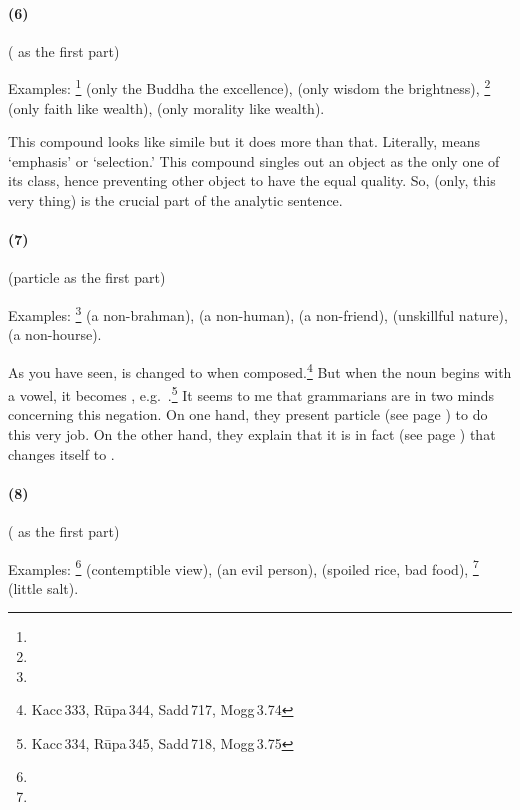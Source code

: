 \paragraph*{(6) }\label{par:samasa-avadh} ( as the first part)\par
Examples: \footnote{} (only the Buddha the excellence),  (only wisdom the brightness), \footnote{} (only faith like wealth),   (only morality like wealth).

This compound looks like simile but it does more than that. Literally,  means `emphasis' or `selection.' This compound singles out an object as the only one of its class, hence preventing other object to have the equal quality. So,  (only, this very thing) is the crucial part of the analytic sentence.

\paragraph*{(7) } (particle  as the first part)\par
Examples: \footnote{} (a non-brahman),  (a non-human),  (a non-friend),  (unskillful nature),  (a non-hourse).

As you have seen,  is changed to  when composed.\footnote{Kacc\,333, R\=upa\,344, Sadd\,717, Mogg\,3.74} But when the noun begins with a vowel, it becomes , e.g.\ .\footnote{Kacc\,334, R\=upa\,345, Sadd\,718, Mogg\,3.75} It seems to me that grammarians are in two minds concerning this negation. On one hand, they present particle  (see page \pageref{nip:a}) to do this very job. On the other hand, they explain that it is in fact  (see page \pageref{nip:na}) that changes itself to .

\paragraph*{(8) } ( as the first part)\par
Examples: \footnote{} (contemptible view),  (an evil person),  (spoiled rice, bad food), \footnote{} (little salt).

